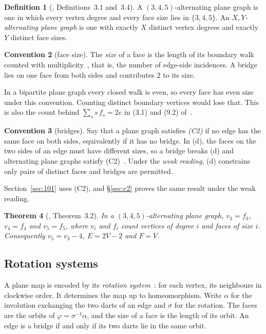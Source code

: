 \documentclass[11pt,a4paper]{amsart}
\theoremstyle{plain}
\newtheorem{theorem}{Theorem}[section]
\theoremstyle{definition}
\newtheorem{definition}[theorem]{Definition}
\newtheorem{convention}[theorem]{Convention}
\begin{document}
\begin{definition}[\cite{AHSSV2015}, Definitions~3.1 and~3.4]
A $(3,4,5)$-alternating plane graph is one in which every vertex degree and
every face size lies in $\{3,4,5\}$. An \emph{$X,Y$-alternating plane graph} is
one with exactly $X$ distinct vertex degrees and exactly $Y$ distinct face
sizes.
\end{definition}

\begin{convention}[face size]\label{conv:c1}
The \emph{size} of a face is the length of its boundary walk counted with
multiplicity~\cite[\S3.3]{MoharThomassen}, that is, the number of edge-side
incidences. A bridge lies on one face from both sides and contributes $2$ to its
size.
\end{convention}

In a bipartite plane graph every closed walk is even, so every face has even
size under this convention. Counting distinct boundary vertices would lose that.
This is also the count behind $\sum_s s\,f_s = 2e$ in (3.1) and (9.2)
of~\cite{AHSSV2015}.

\begin{convention}[bridges]\label{conv:c2}
Say that a plane graph satisfies \emph{(C2)} if no edge has the same face on
both sides, equivalently if it has no bridge. In (d), the faces on the two sides
of an edge must have different sizes, so a bridge breaks (d) and alternating
plane graphs satisfy (C2)~\cite{AHSSV2015}. Under the \emph{weak reading}, (d)
constrains only pairs of distinct faces and bridges are permitted.
\end{convention}

Section~\ref{sec:101} uses (C2), and \S\ref{sec:c2} proves the same result under
the weak reading.

\begin{theorem}[\cite{AHSSV2015}, Theorem~3.2]\label{thm:32}
In a $(3,4,5)$-alternating plane graph, $v_3 = f_3$, $v_4 = f_4$ and
$v_5 = f_5$, where $v_i$ and $f_i$ count vertices of degree $i$ and faces of
size $i$. Consequently $v_5 = v_3 - 4$, $E = 2V - 2$ and $F = V$.
\end{theorem}

\subsection{Rotation systems}

A plane map is encoded by its \emph{rotation system}~\cite{MoharThomassen}: for
each vertex, its neighbours in clockwise order. It determines the map up to
homeomorphism. Write $\alpha$ for the involution exchanging the two darts of an
edge and $\sigma$ for the rotation. The faces are the orbits of
$\varphi = \sigma^{-1}\alpha$, and the size of a face is the length of its
orbit. An edge is a bridge if and only if its two darts lie in the same orbit.
\end{document}
